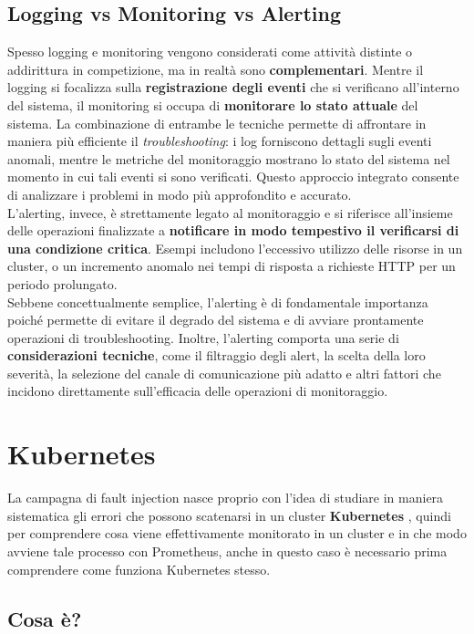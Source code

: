 \subsection{Logging vs Monitoring vs Alerting} 
Spesso logging e monitoring vengono considerati come attività distinte o addirittura in competizione, ma in realtà sono \textbf{complementari}. Mentre il logging si focalizza sulla \textbf{registrazione degli eventi} che si verificano all'interno del sistema, il monitoring si occupa di \textbf{monitorare lo stato attuale} del sistema. La combinazione di entrambe le tecniche permette di affrontare in maniera più efficiente il \textit{troubleshooting}: i log forniscono dettagli sugli eventi anomali, mentre le metriche del monitoraggio mostrano lo stato del sistema nel momento in cui tali eventi si sono verificati. Questo approccio integrato consente di analizzare i problemi in modo più approfondito e accurato. \\
L’alerting, invece, è strettamente legato al monitoraggio e si riferisce all’insieme delle operazioni finalizzate a \textbf{notificare in modo tempestivo il verificarsi di una condizione critica}. Esempi includono l’eccessivo utilizzo delle risorse in un cluster, o un incremento anomalo nei tempi di risposta a richieste HTTP per un periodo prolungato. \\
Sebbene concettualmente semplice, l’alerting è di fondamentale importanza poiché permette di evitare il degrado del sistema e di avviare prontamente operazioni di troubleshooting. Inoltre, l’alerting comporta una serie di \textbf{considerazioni tecniche}, come il filtraggio degli alert, la scelta della loro severità, la selezione del canale di comunicazione più adatto e altri fattori che incidono direttamente sull’efficacia delle operazioni di monitoraggio.



\section{Kubernetes}
La campagna di fault injection nasce proprio con l'idea di studiare in maniera sistematica gli errori che possono scatenarsi in un cluster \textbf{Kubernetes} \cite{Kubernetes}, quindi per comprendere cosa viene effettivamente monitorato in un cluster e in che modo avviene tale processo con Prometheus, anche in questo caso è necessario prima comprendere come funziona Kubernetes stesso.

\subsection{Cosa è?}

